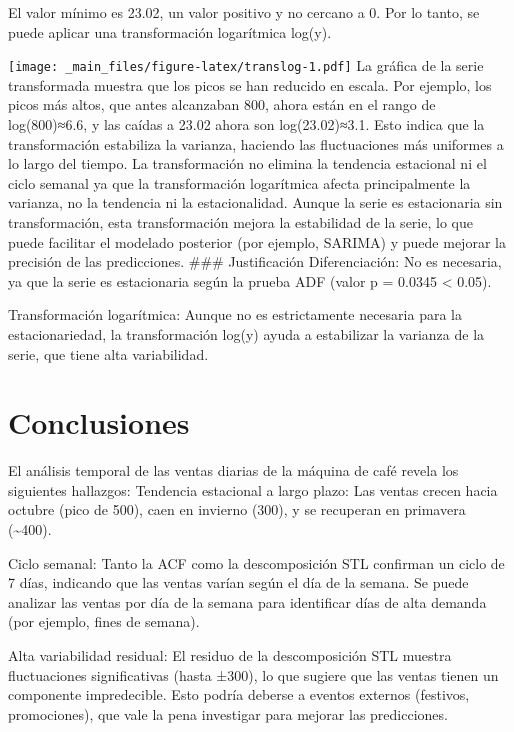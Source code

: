 \documentclass[
]{book}
\begin{document}
El valor mínimo es 23.02, un valor positivo y no cercano a 0. Por lo
tanto, se puede aplicar una transformación logarítmica log⁡(y).

\texttt{[image: \_main\_files/figure-latex/translog-1.pdf]} La gráfica de
la serie transformada muestra que los picos se han reducido en escala.
Por ejemplo, los picos más altos, que antes alcanzaban 800, ahora están
en el rango de log⁡(800)≈6.6, y las caídas a 23.02 ahora son
log⁡(23.02)≈3.1. Esto indica que la transformación estabiliza la
varianza, haciendo las fluctuaciones más uniformes a lo largo del
tiempo. La transformación no elimina la tendencia estacional ni el ciclo
semanal ya que la transformación logarítmica afecta principalmente la
varianza, no la tendencia ni la estacionalidad. Aunque la serie es
estacionaria sin transformación, esta transformación mejora la
estabilidad de la serie, lo que puede facilitar el modelado posterior
(por ejemplo, SARIMA) y puede mejorar la precisión de las predicciones.
\#\#\# Justificación Diferenciación: No es necesaria, ya que la serie es
estacionaria según la prueba ADF (valor p = 0.0345 \textless{} 0.05).

Transformación logarítmica: Aunque no es estrictamente necesaria para la
estacionariedad, la transformación log⁡(y) ayuda a estabilizar la
varianza de la serie, que tiene alta variabilidad.

\section{Conclusiones}\label{conclusiones}

El análisis temporal de las ventas diarias de la máquina de café revela
los siguientes hallazgos: Tendencia estacional a largo plazo: Las ventas
crecen hacia octubre (pico de 500), caen en invierno (300), y se
recuperan en primavera (\textasciitilde400).

Ciclo semanal: Tanto la ACF como la descomposición STL confirman un
ciclo de 7 días, indicando que las ventas varían según el día de la
semana. Se puede analizar las ventas por día de la semana para
identificar días de alta demanda (por ejemplo, fines de semana).

Alta variabilidad residual: El residuo de la descomposición STL muestra
fluctuaciones significativas (hasta ±300), lo que sugiere que las ventas
tienen un componente impredecible. Esto podría deberse a eventos
externos (festivos, promociones), que vale la pena investigar para
mejorar las predicciones.
\end{document}
